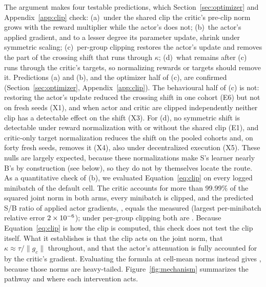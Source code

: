 The argument makes four testable predictions, which Section~\ref{sec:optimizer} and Appendix~\ref{app:clip} check:
(a)~under the shared clip the critic's pre-clip norm grows with the reward multiplier while the actor's does
not; (b)~the actor's applied gradient, and to a lesser degree its parameter update, shrink under symmetric
scaling; (c)~per-group clipping restores the actor's update and removes the part of the crossing shift that
runs through $\kappa$; (d)~what remains after (c) runs through the critic's targets, so normalizing rewards
or targets should remove it. Predictions (a) and (b), and the optimizer half of (c), are confirmed (Section~\ref{sec:optimizer}, Appendix~\ref{app:clip}). The
behavioural half of (c) is not: restoring the actor's update reduced the crossing shift in one cohort (E6) but not
on fresh seeds (X1), and when actor and critic are clipped independently neither clip has a detectable effect on the
shift (X3). For (d), no symmetric shift is detectable under reward normalization with or without the shared clip (E1),
and critic-only target normalization reduces the shift on the pooled cohorts and, on forty fresh seeds, removes it (X4), also under decentralized execution (X5). These nulls are largely expected, because these normalizations make S's learner nearly B's by construction (see below), so they do not by themselves locate the route. As a quantitative check of (b), we evaluated Equation~\ref{eq:clip} on every logged minibatch of the default
cell. The critic accounts for more than 99.99\% of the squared joint norm in both arms, every minibatch is clipped,
and the predicted S/B ratio of applied actor gradients, \VeqPred{}, equals the measured \VeqMeas{} (largest
per-minibatch relative error $2\times10^{-6}{}$); under per-group clipping both are \VeqGroupMeas{}. Because
Equation~\ref{eq:clip} is how the clip is computed, this check does not test the clip itself. What it establishes
is that the clip acts on the joint norm, that $\kappa\approx\tau/\|g_c\|$ throughout, and that the actor's
attenuation is fully accounted for by the critic's gradient. Evaluating the formula at cell-mean norms instead gives
\VrvPredRatio{}, because those norms are heavy-tailed. Figure~\ref{fig:mechanism} summarizes the pathway and
where each intervention acts.

